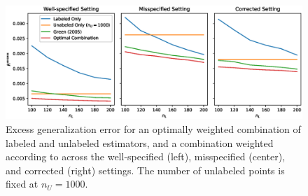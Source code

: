 
\begin{figure}
    \centering
    \includegraphics[width=.48\textwidth]{eps_figures/combined.eps}
    \caption{Excess generalization error for an optimally weighted combination of labeled and unlabeled estimators, and a combination weighted according to \cite{GreenStrawderman2001} across the well-specified (left), misspecified (center), and corrected (right) settings. The number of unlabeled points is fixed at $n_U=1000$. %
    }
    \label{fig:combined}
\end{figure}